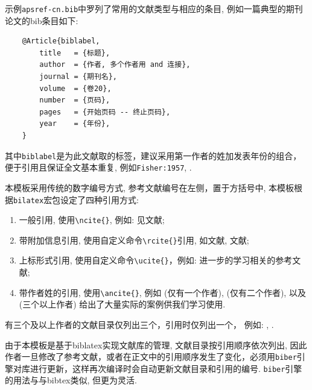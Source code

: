 \documentclass[Chinese]{APSart}
\begin{document}
示例\texttt{apsref-cn.bib}中罗列了常用的文献类型与相应的条目, 例如一篇典型的期刊论文的bib条目如下:
\begin{verbatim}
	@Article{biblabel, 
		title   = {标题}, 
		author  = {作者, 多个作者用 and 连接}, 
		journal = {期刊名}, 
		volume  = {卷20}, 
		number  = {页码}, 
		pages   = {开始页码 -- 终止页码}, 
		year    = {年份}, 
	}
\end{verbatim} 
其中\texttt{biblabel}是为此文献取的标签，建议采用第一作者的姓加发表年份的组合，便于引用且保证全文基本重复, 例如\texttt{Fisher:1957}, . 

\begin{remark}
本模板采用传统的数字编号方式, 参考文献编号在左侧，置于方括号中, 本模板根据\texttt{bilatex}宏包设定了四种引用方式:
\begin{enumerate}[leftmargin=7.8mm,itemsep=-0.1ex,label= \arabic*)]%
	\item 一般引用, 使用\verb|\ncite{}|, 例如: 见文献;
	\item 带附加信息引用, 使用自定义命令\verb|\rcite{}|引用, 如文献, 文献;
	\item 上标形式引用, 使用自定义命令\verb|\ucite{}|，例如: 进一步的学习相关的参考文献; 
	\item 带作者姓的引用, 使用\verb|\ancite{}|, 例如 (仅有一个作者), (仅有二个作者),  以及(三个以上作者) 给出了大量实际的案例供我们学习使用. 
\end{enumerate}
\end{remark}	

\begin{remark}
有三个及以上作者的文献目录仅列出三个，引用时仅列出一个， 例如: , . 	
\end{remark}

\begin{remark}
由于本模板是基于biblatex实现文献库的管理, 文献目录按引用顺序依次列出, 因此作者一旦修改了参考文献，或者在正文中的引用顺序发生了变化，必须用\texttt{biber}引擎对库进行更新，这样再次编译时会自动更新文献目录和引用的编号.	\texttt{biber}引擎的用法与与bibtex类似, 但更为灵活.
\end{remark}



%
\appendix
{}
\makeatletter 
\newcommand{\section@cntformat}{附录 \thesection:\ }
\makeatother
\end{document}
